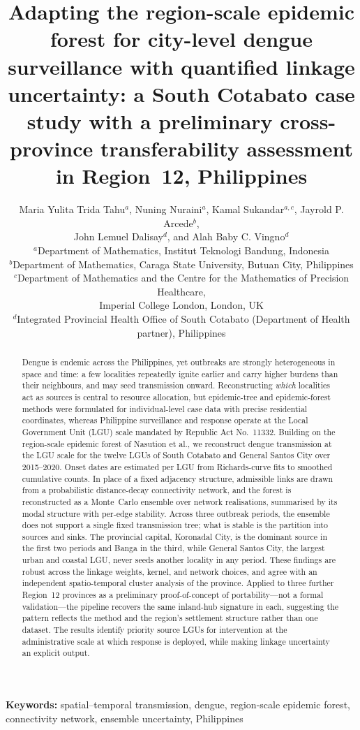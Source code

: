 \documentclass[a4paper,11pt]{article}
\title{Adapting the region-scale epidemic forest for city-level dengue
surveillance with quantified linkage uncertainty: a South Cotabato case study
with a preliminary cross-province transferability assessment in Region~12, Philippines}
\author{
Maria Yulita Trida Tahu$^{a}$, Nuning Nuraini$^{a}$, Kamal Sukandar$^{a,c}$,
Jayrold P. Arcede$^{b}$,\\ John Lemuel Dalisay$^{d}$, and Alah Baby C. Vingno$^{d}$
\\[6pt]
\small $^{a}$Department of Mathematics, Institut Teknologi Bandung, Indonesia \\
\small $^{b}$Department of Mathematics, Caraga State University, Butuan City, Philippines \\
\small $^{c}$Department of Mathematics and the Centre for the Mathematics of Precision Healthcare, \\
\small Imperial College London, London, UK \\
\small $^{d}$Integrated Provincial Health Office of South Cotabato (Department of Health partner), Philippines
}
\date{}
\begin{document}
\maketitle

\begin{abstract}
Dengue is endemic across the Philippines, yet outbreaks are strongly
heterogeneous in space and time: a few localities repeatedly ignite earlier and
carry higher burdens than their neighbours, and may seed transmission onward.
Reconstructing \emph{which} localities act as sources is central to resource
allocation, but epidemic-tree and epidemic-forest methods were formulated for
individual-level case data with precise residential coordinates, whereas
Philippine surveillance and response operate at the Local Government Unit (LGU)
scale mandated by Republic Act No.~11332. Building on the region-scale epidemic
forest of Nasution et al., we reconstruct dengue transmission at the LGU scale for
the twelve LGUs of South Cotabato and General Santos City over 2015--2020. Onset
dates are estimated per LGU from Richards-curve fits to smoothed cumulative
counts. In place of a fixed adjacency structure, admissible links are drawn from
a probabilistic distance-decay connectivity network, and the forest is
reconstructed as a Monte~Carlo ensemble over network realisations, summarised by
its modal structure with per-edge stability. Across three outbreak periods, the
ensemble does not support a single fixed transmission tree; what is stable is the
partition into sources and sinks. The provincial capital, Koronadal City, is the
dominant source in the first two periods and Banga in the third, while General
Santos City, the largest urban and coastal LGU, never seeds another locality in
any period. These findings are robust across the linkage weights, kernel, and network choices,
and agree with an independent spatio-temporal cluster analysis of the province.
Applied to three further Region~12 provinces as a preliminary proof-of-concept of
portability---not a formal validation---the pipeline recovers the same inland-hub
signature in each, suggesting the pattern reflects the method and the region's
settlement structure rather than one dataset. The results identify priority source
LGUs for intervention at the administrative scale at which response is deployed,
while making linkage uncertainty an explicit output.
\end{abstract}

\noindent\textbf{Keywords:} spatial--temporal transmission, dengue, region-scale
epidemic forest, connectivity network, ensemble uncertainty, Philippines
\end{document}
